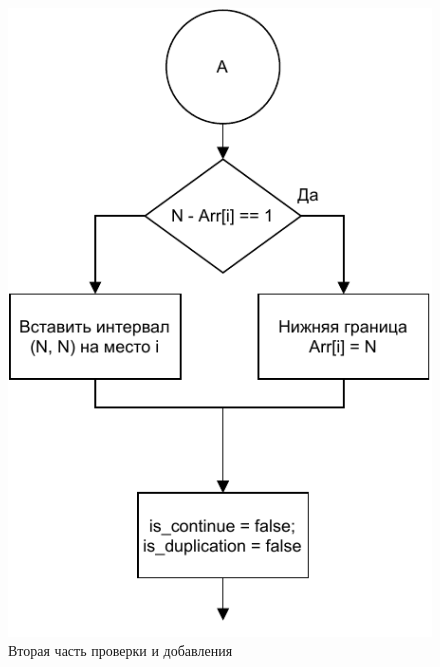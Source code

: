 \documentclass[14pt, a4paper]{extarticle}
\begin{document}
\begin{figure}[H]
	\centering
	\includegraphics[scale=1]{check2.pdf}
	\caption{Вторая часть проверки и добавления}
	\label{check2}
\end{figure}
\end{document}
